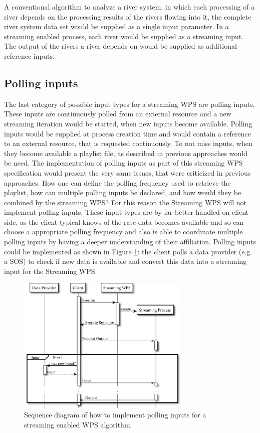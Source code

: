 			A conventional algorithm to analyze a river system, in which each processing of a river depends on the processing results of the rivers flowing into it, the complete river system data set would be supplied as a single input parameter. In a streaming enabled process, each river would be supplied as a streaming input. The output of the rivers a river depends on would be supplied as additional reference inputs.
		\subsection{Polling inputs}
			\label{sec:stream:input:polling}
			The last category of possible input types for a streaming \ac{WPS} are polling inputs. These inputs are continuously polled from an external resource and a new streaming iteration would be started, when new inputs become available. Polling inputs would be supplied at process creation time and would contain a reference to an external resource, that is requested continuously. To not miss inputs, when they become available a playlist file, as described in previous approaches \citep{foerster2012live} would be need. The implementation of polling inputs as part of this streaming \ac{WPS} specification would present the very same issues, that were criticized in previous approaches. How one can define the polling frequency used to retrieve the playlist, how can multiple polling inputs be declared, and how would they be combined by the streaming \ac{WPS}? For this reason the Streaming \ac{WPS} will not implement polling inputs. These input types are by far better handled on client side, as the client typical knows of the rate data becomes available and so can choose a appropriate polling frequency and also is able to coordinate multiple polling inputs by having a deeper understanding of their affiliation. Polling inputs could be implemented as shown in Figure \ref{fig:sd:polling}: the client polls a data provider (e.g. a \ac{SOS}) to check if new data is available and convert this data into a streaming input for the Streaming \ac{WPS}.
			\begin{figure}[!htb]
				\centering
				\includegraphics[width=0.73521126760563382\textwidth]{figures/sequence-diagramm-polling.pdf}
				\caption{\label{fig:sd:polling}Sequence diagram of how to implement polling inputs for a streaming enabled WPS algorithm.}
			\end{figure}

